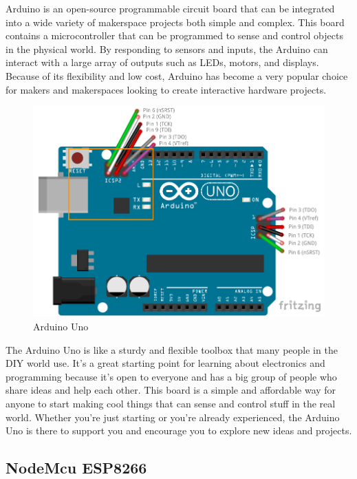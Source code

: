 \documentclass[conference]{IEEEtran}
\begin{document}
Arduino is an open-source programmable circuit board that can be integrated into a wide variety of makerspace projects both simple and complex.  This board contains a microcontroller that can be programmed to sense and control objects in the physical world.   By responding to sensors and inputs, the Arduino can interact with a large array of outputs such as LEDs, motors, and displays.  Because of its flexibility and low cost, Arduino has become a very popular choice for makers and makerspaces looking to create interactive hardware projects.
\begin{figure}[th]
    \centering
    \includegraphics[width=\linewidth]{images/fritzing-arduino-uno-icsp.png}
    \caption{Arduino Uno}
    \label{fig:enter-label}
\end{figure}
The Arduino Uno is like a sturdy and flexible toolbox that many people in the DIY world use. It's a great starting point for learning about electronics and programming because it's open to everyone and has a big group of people who share ideas and help each other. This board is a simple and affordable way for anyone to start making cool things that can sense and control stuff in the real world. Whether you're just starting or you're already experienced, the Arduino Uno is there to support you and encourage you to explore new ideas and projects.

\subsection{NodeMcu ESP8266}
\end{document}
